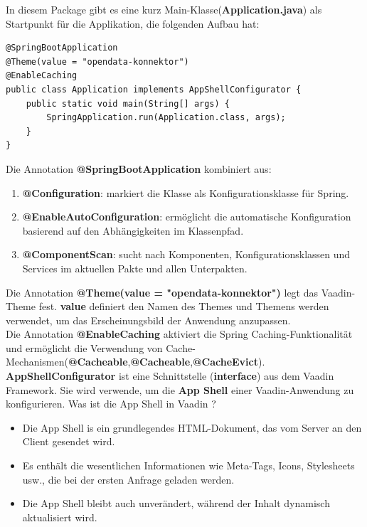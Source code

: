 \documentclass[a4paper,12pt]{scrreprt}
\begin{document}
	In diesem Package gibt es eine kurz Main-Klasse(\textbf{Application.java}) als Startpunkt für die Applikation, die folgenden Aufbau hat: \\
\begin{lstlisting}
@SpringBootApplication
@Theme(value = "opendata-konnektor")
@EnableCaching
public class Application implements AppShellConfigurator {
	public static void main(String[] args) {
		SpringApplication.run(Application.class, args);
	}
}
\end{lstlisting}
	Die Annotation \textbf{@SpringBootApplication} kombiniert aus:
		\begin{enumerate}
			\item  \textbf{@Configuration}: markiert die Klasse als Konfigurationsklasse für Spring.
			\item  \textbf{@EnableAutoConfiguration}: ermöglicht die automatische Konfiguration basierend auf den Abhängigkeiten im Klassenpfad.
			\item  \textbf{@ComponentScan}: sucht nach Komponenten, Konfigurationsklassen und Services im aktuellen Pakte und allen Unterpakten.
		\end{enumerate}
	Die Annotation \textbf{@Theme(value = "opendata-konnektor")} legt das Vaadin-Theme fest. \textbf{value} definiert den Namen des Themes und Themens werden verwendet, um das Erscheinungsbild der Anwendung anzupassen.\\
	Die Annotation \textbf{@EnableCaching} aktiviert die Spring Caching-Funktionalität und ermöglicht die Verwendung von Cache-Mechanismen(\textbf{@Cacheable},\textbf{@Cacheable},\textbf{@CacheEvict}).\\
	\textbf{AppShellConfigurator} ist eine Schnittstelle (\textbf{interface}) aus dem Vaadin Framework. Sie wird verwende, um die \textbf{App Shell} einer Vaadin-Anwendung zu konfigurieren. Was ist die App Shell in Vaadin ?
	\begin{itemize}
		\item Die App Shell is ein grundlegendes HTML-Dokument, das vom Server an den Client gesendet wird.
		\item Es enthält die wesentlichen Informationen wie Meta-Tags, Icons, Stylesheets usw., die bei der ersten Anfrage geladen werden.
		\item Die App Shell bleibt auch unverändert, während der Inhalt dynamisch aktualisiert wird.
	\end{itemize}
	
\end{document}
